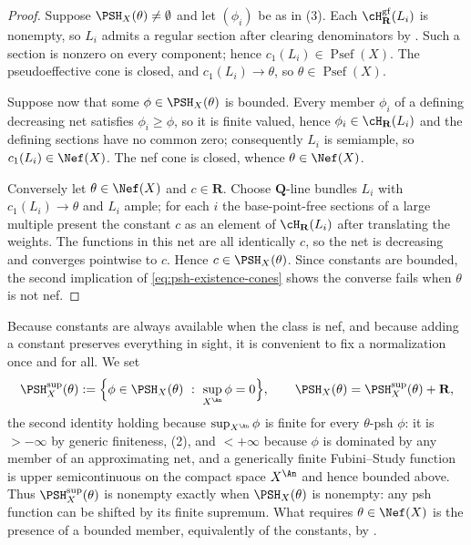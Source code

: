 \begin{proof}
Suppose $\PSH_X(\theta)\ne\emptyset$ and let $(\phi_i)$ be as in
(3).  Each $\cH^{\mathrm{gf}}_{\mathbf R}(L_i)$ is
nonempty, so $L_i$ admits a regular section after clearing denominators
by .
Such a section is nonzero on every component; hence $c_1(L_i)\in\operatorname{Psef}(X)$.  The
pseudoeffective cone is closed, and $c_1(L_i)\to\theta$, so
$\theta\in\operatorname{Psef}(X)$.

Suppose now that some $\phi\in\PSH_X(\theta)$ is bounded.  Every member
$\phi_i$ of a defining decreasing net satisfies $\phi_i\geq\phi$, so it
is finite valued, hence
$\phi_i\in\cH_{\mathbf R}(L_i)$ and the defining sections have no common
zero; consequently $L_i$ is semiample, so $c_1(L_i)\in\Nef(X)$.  The nef
cone is closed, whence $\theta\in\Nef(X)$.

Conversely let $\theta\in\Nef(X)$ and $c\in\mathbf R$.  Choose
$\mathbf Q$-line bundles $L_i$ with $c_1(L_i)\to\theta$ and $L_i$
ample; for each $i$ the base-point-free sections of a large multiple
present the constant $c$ as an element of $\cH_{\mathbf R}(L_i)$ after
translating the weights.  The functions in this net are all identically
$c$, so the net is decreasing and converges pointwise to $c$.
Hence $c\in\PSH_X(\theta)$.  Since constants are bounded, the second
implication of \eqref{eq:psh-existence-cones} shows the converse fails when
$\theta$ is not nef.
\end{proof}

Because constants are always available when the class is nef, and because
adding a constant preserves everything in sight, it is convenient to fix a
normalization once and for all.  We set
\begin{equation}
\label{eq:normalized-psh-space}
 \PSH_X^{\sup}(\theta)
 :=\Bigl\{\phi\in\PSH_X(\theta)\ :\ \sup_{X^{\An}}\phi=0\Bigr\},
 \qquad
 \PSH_X(\theta)=\PSH_X^{\sup}(\theta)+\mathbf R ,
\end{equation}
the second identity holding because $\sup_{X^{\An}}\phi$ is finite for
every $\theta$-psh $\phi$: it is $>-\infty$ by generic finiteness,
(2), and $<+\infty$ because $\phi$ is dominated by any
member of an approximating net, and a generically finite Fubini--Study
function is upper semicontinuous on the compact space $X^{\An}$ and hence
bounded above.  Thus $\PSH_X^{\sup}(\theta)$ is nonempty exactly when
$\PSH_X(\theta)$ is nonempty: any psh function can be shifted by its
finite supremum.  What requires $\theta\in\Nef(X)$ is the presence of a
bounded member, equivalently of the constants, by
.

